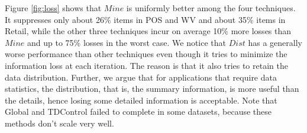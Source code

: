 Figure \ref{fig:loss}
shows that $Mine$ is uniformly better among the four techniques.
It suppresses only about 26\% items in POS and WV and about 35\% items in
Retail, while the other three techniques incur on average 10\% more losses
than  $Mine$ and up to 75\% losses in the worst case. We notice that $Dist$
has a generally worse performance than other techniques even though it tries to minimize the
information loss at each iteration.
The reason is that it also tries to retain the data
distribution.
Further, we argue that for applications that require data statistics,
the distribution, that is, the summary information, is more useful than the
details, hence losing some detailed information is acceptable.
Note that Global and TDControl failed to complete in some datasets,
because these methods don't scale very well.

